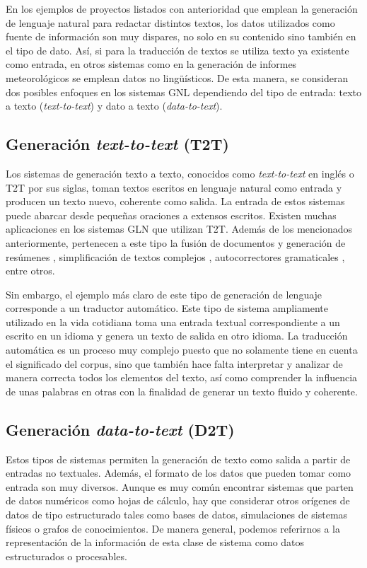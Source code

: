 En los ejemplos de proyectos listados con anterioridad que emplean la generación de lenguaje natural para redactar distintos textos, los datos utilizados como fuente de información son muy dispares, no solo en su contenido sino también en el tipo de dato. Así, si para la traducción de textos se utiliza texto ya existente como entrada, en otros sistemas como en la generación de informes meteorológicos se emplean datos no lingüísticos. De esta manera, se consideran dos posibles enfoques en los sistemas GNL dependiendo del tipo de entrada: texto a texto (\textit{text-to-text}) y dato a texto (\textit{data-to-text}).

\subsection{Generación \textit{text-to-text} (T2T)}
Los sistemas de generación texto a texto, conocidos como \textit{text-to-text} en inglés o T2T por sus siglas, toman textos escritos en lenguaje natural como entrada y producen un texto nuevo, coherente como salida. La entrada de estos sistemas puede abarcar desde pequeñas oraciones a extensos escritos. Existen muchas aplicaciones en los sistemas GLN que utilizan T2T. Además de los mencionados anteriormente, pertenecen a este tipo la fusión de documentos y generación de resúmenes \citep{clarke2010discourse}, simplificación de textos complejos \citep{sulem2018simple}, autocorrectores gramaticales \citep{Ge2019AutomaticGE}, entre otros. 

Sin embargo, el ejemplo más claro de este tipo de generación de lenguaje corresponde a un traductor automático. Este tipo de sistema ampliamente utilizado en la vida cotidiana toma una entrada textual correspondiente a un escrito en un idioma y genera un texto de salida en otro idioma. La traducción automática es un proceso muy complejo puesto que no solamente tiene en cuenta el significado del corpus, sino que también hace falta interpretar y analizar de manera correcta todos los elementos del texto, así como comprender la influencia de unas palabras en otras con la finalidad de  generar un texto fluido y coherente. 

\subsection{Generación \textit{data-to-text} (D2T)}\label{cap:nglD2T}
Estos tipos de sistemas permiten la generación de texto como salida a partir de entradas no textuales. Además, el formato de los datos que pueden tomar como entrada son muy diversos. Aunque es muy común encontrar sistemas que parten de datos numéricos como hojas de cálculo, hay que considerar otros orígenes de datos de tipo estructurado tales como bases de datos, simulaciones de sistemas físicos o grafos de conocimientos. De manera general, podemos referirnos a la representación de la información de esta clase de sistema como datos estructurados o procesables.

